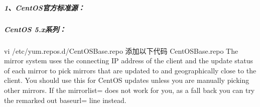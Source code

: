 \documentclass[letterpaper,10pt,english]{sphinxmanual}
\begin{document}
\subparagraph{1、CentOS官方标准源：}
\label{\detokenize{software_manage/yum/yum_official_sync:centos}}

\subparagraph{CentOS 5.x系列：}
\label{\detokenize{software_manage/yum/yum_official_sync:centos-5-x}}
%
\begin{sphinxVerbatim}[commandchars=\\\{\}]
vi /etc/yum.repos.d/CentOS\PYGZhy{}Base.repo \PYGZsh{}添加以下代码
\PYGZsh{} CentOS\PYGZhy{}Base.repo
\PYGZsh{}
\PYGZsh{} The mirror system uses the connecting IP address of the client and the
\PYGZsh{} update status of each mirror to pick mirrors that are updated to and
\PYGZsh{} geographically close to the client. You should use this for CentOS updates
\PYGZsh{} unless you are manually picking other mirrors.
\PYGZsh{}
\PYGZsh{} If the mirrorlist= does not work for you, as a fall back you can try the
\PYGZsh{} remarked out baseurl= line instead.


\end{sphinxVerbatim}
\end{document}
